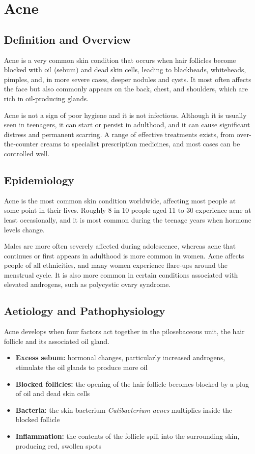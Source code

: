 \chapter{Acne}

\section*{Definition and Overview}
Acne is a very common skin condition that occurs when hair follicles become blocked with oil (sebum) and dead skin cells, leading to blackheads, whiteheads, pimples, and, in more severe cases, deeper nodules and cysts. It most often affects the face but also commonly appears on the back, chest, and shoulders, which are rich in oil-producing glands.

Acne is not a sign of poor hygiene and it is not infectious. Although it is usually seen in teenagers, it can start or persist in adulthood, and it can cause significant distress and permanent scarring. A range of effective treatments exists, from over-the-counter creams to specialist prescription medicines, and most cases can be controlled well.

\section*{Epidemiology}
Acne is the most common skin condition worldwide, affecting most people at some point in their lives. Roughly 8 in 10 people aged 11 to 30 experience acne at least occasionally, and it is most common during the teenage years when hormone levels change.

Males are more often severely affected during adolescence, whereas acne that continues or first appears in adulthood is more common in women. Acne affects people of all ethnicities, and many women experience flare-ups around the menstrual cycle. It is also more common in certain conditions associated with elevated androgens, such as polycystic ovary syndrome.

\section*{Aetiology and Pathophysiology}
Acne develops when four factors act together in the pilosebaceous unit, the hair follicle and its associated oil gland.

\begin{itemize}
    \item \textbf{Excess sebum:} hormonal changes, particularly increased androgens, stimulate the oil glands to produce more oil
    \item \textbf{Blocked follicles:} the opening of the hair follicle becomes blocked by a plug of oil and dead skin cells
    \item \textbf{Bacteria:} the skin bacterium \textit{Cutibacterium acnes} multiplies inside the blocked follicle
    \item \textbf{Inflammation:} the contents of the follicle spill into the surrounding skin, producing red, swollen spots
\end{itemize}

